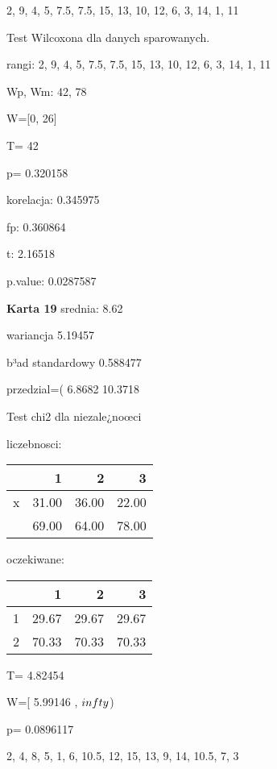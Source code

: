 \documentclass[a4paper,12pt]{article}
\begin{document}
\begin{multicols}{3}
  2, 9, 4, 5, 7.5, 7.5, 15, 13, 10, 12, 6, 3, 14, 1, 11 

  Test Wilcoxona dla danych sparowanych. 
  
  rangi: 2, 9, 4, 5, 7.5, 7.5, 15, 13, 10, 12, 6, 3, 14, 1, 11 
  
  Wp, Wm:  42,  78 
  
  W=[0, 26]  
  
  T=  42 
  
  p= 0.320158 \vspace{1cm} 

  korelacja: 0.345975
     
     fp: 0.360864
     
     t: 2.16518
     
     p.value: 0.0287587 \vspace{1cm} 

  \textbf{Karta  19 } 
 srednia: 8.62 
     
     wariancja 5.19457  
     
     b³ad standardowy 0.588477 
     
     przedzial=( 6.8682 10.3718 \vspace{1cm} 

  Test chi2 dla niezale¿noœci 
   
   liczebnosci: %
\begin{tabular}{rrrr}
  \hline
 & 1 & 2 & 3 \\
  \hline
x & 31.00 & 36.00 & 22.00 \\
   & 69.00 & 64.00 & 78.00 \\
   \hline
\end{tabular}
 
   
   oczekiwane: %
\begin{tabular}{rrrr}
  \hline
 & 1 & 2 & 3 \\
  \hline
1 & 29.67 & 29.67 & 29.67 \\
  2 & 70.33 & 70.33 & 70.33 \\
   \hline
\end{tabular}
 
   
   T= 4.82454 
   
   W=[ 5.99146 , $\\infty$) 
   
   p= 0.0896117 \vspace{1cm} 

  2, 4, 8, 5, 1, 6, 10.5, 12, 15, 13, 9, 14, 10.5, 7, 3 


\end{multicols}
\end{document}

